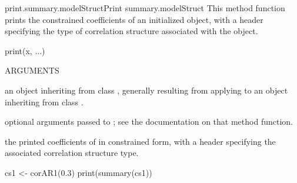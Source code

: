 \documentclass[pdftex]{article} \usepackage{url,graphicx}
\begin{document}
\begin{Helpfile}{print.summary.modelStruct}{Print summary.modelStruct}
This method function prints the constrained coefficients of
an initialized  object, with a header specifying the
type of correlation structure associated with the object.
\begin{Example}
print(x, ...)
\end{Example}
\begin{Argument}{ARGUMENTS}
\item[\Co{x:}]
an object inheriting from class ,
generally resulting from applying  to an object
inheriting from class .
\item[\Co{...:}]
optional arguments passed to ; see
the documentation on that method function.
\end{Argument}
the printed coefficients of  in constrained form, with a
header specifying the associated correlation structure type.
\need 15pt
\vspace{-16pt} 
\begin{Example}
cs1 <- corAR1(0.3)
print(summary(cs1))
\end{Example}
\end{Helpfile}
\end{document}
